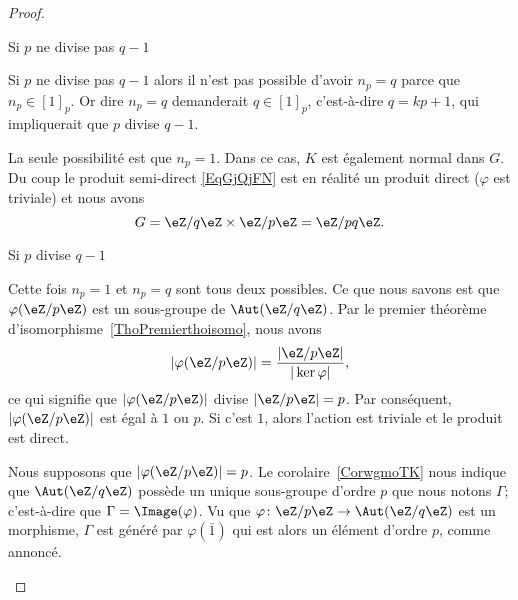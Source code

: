 \begin{proof}
\begin{subproof}
		\item[Si \( p\) ne divise pas \( q-1\)]

		Si \( p\) ne divise pas \( q-1\) alors il n'est pas possible d'avoir \( n_p=q\) parce que \( n_p\in [1]_p\). Or dire \( n_p=q\) demanderait \( q\in [1]_p\), c'est-à-dire \( q=kp+1\), qui impliquerait que \( p\) divise \( q-1\).

		La seule possibilité est que \( n_p=1\). Dans ce cas, \( K\) est également normal dans \( G\). Du coup le produit semi-direct \eqref{EqGjQjFN} est en réalité un produit direct (\( \varphi\) est triviale) et nous avons
		\begin{equation}
			G=\eZ/q\eZ\times \eZ/p\eZ=\eZ/pq\eZ.
		\end{equation}

		\item[Si \( p\) divise \( q-1\)]

		Cette fois \( n_p=1\) et \( n_p=q\) sont tous deux possibles. Ce que nous savons est que \( \varphi(\eZ/p\eZ)\) est un sous-groupe de \( \Aut(\eZ/q\eZ)\). Par le premier théorème d'isomorphisme~\ref{ThoPremierthoisomo}, nous avons
		\begin{equation}
			| \varphi(\eZ/p\eZ) |=\frac{ | \eZ/p\eZ | }{ | \ker\varphi | },
		\end{equation}
		ce qui signifie que \( | \varphi(\eZ/p\eZ) |\) divise \( | \eZ/p\eZ |=p\). Par conséquent, \( | \varphi(\eZ/p\eZ) |\) est égal à \( 1\) ou \( p\). Si c'est \( 1\), alors l'action est triviale et le produit est direct.

		Nous supposons que \( | \varphi(\eZ/p\eZ) |=p\). Le corolaire~\ref{CorwgmoTK} nous indique que \( \Aut(\eZ/q\eZ)\) possède un unique sous-groupe d'ordre \( p\) que nous notons \( \Gamma\); c'est-à-dire que \( \Gamma=\Image(\varphi)\). Vu que \( \varphi\colon \eZ/p\eZ\to \Aut(\eZ/q\eZ)\) est un morphisme, \( \Gamma\) est généré par \( \varphi(\bar 1)\) qui est alors un élément d'ordre \( p\), comme annoncé.


\end{subproof}
\end{proof}
